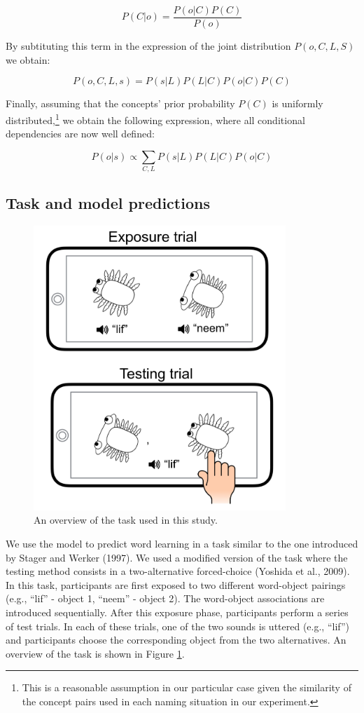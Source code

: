 \documentclass[english,,man]{apa6}
\let\rmarkdownfootnote\footnote%
\def\footnote{\protect\rmarkdownfootnote}
\theoremstyle{definition}
\theoremstyle{definition}
\theoremstyle{definition}
\theoremstyle{remark}
\begin{document}
\[P(C|o) = \frac{P(o|C)P(C)}{P(o)}\]

By subtituting this term in the expression of the joint distribution
\(P(o,C,L,S)\) we obtain:

\[P(o,C,L,s) = P(s|L)P(L|C)P(o|C)P(C)\]

Finally, assuming that the concepts' prior probability \(P(C)\) is
uniformly
distributed,\footnote{This is a reasonable assumption in our particular case given the similarity of the concept pairs used in each naming situation in our experiment.}
we obtain the following expression, where all conditional dependencies
are now well defined:

\begin{equation} \label{eq:general}
P(o|s) \propto \sum_{C,L}  P(s|L)P(L|C)P(o|C)
\end{equation}

\subsection{Task and model
predictions}\label{task-and-model-predictions}

\begin{figure}[t]

{\centering \includegraphics[width=3.75in]{figs/task} 

}

\caption{An overview of the task used in this study.}\label{fig:task}
\end{figure}

We use the model to predict word learning in a task similar to the one
introduced by Stager and Werker (1997). We used a modified version of
the task where the testing method consists in a two-alternative
forced-choice (Yoshida et al., 2009). In this task, participants are
first exposed to two different word-object pairings (e.g., \enquote{lif}
- object 1, \enquote{neem} - object 2). The word-object associations are
introduced sequentially. After this exposure phase, participants perform
a series of test trials. In each of these trials, one of the two sounds
is uttered (e.g., \enquote{lif}) and participants choose the
corresponding object from the two alternatives. An overview of the task
is shown in Figure \ref{fig:task}.
\end{document}
